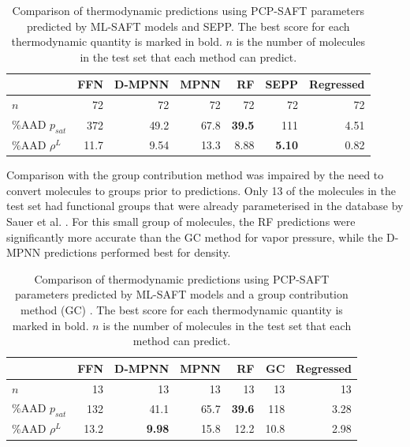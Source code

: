 \begin{table}
	\caption{Comparison of thermodynamic predictions using PCP-SAFT parameters predicted by ML-SAFT models and SEPP.\cite{Kaminski2020} The best score for each thermodynamic quantity is marked in bold. $n$ is the number of molecules in the test set that each method can predict.}
        \label{tab:sepp}
	\begin{center}
        \begin{tabular}{lrrrrr|r}
            & FFN & D-MPNN & MPNN & RF & SEPP & Regressed \\
            \hline
            $n$ & 72 & 72 & 72 & 72 & 72 & 72 \\
            \%AAD $p_{sat}$ & 372 & 49.2 & 67.8 & \textbf{39.5} & 111 & 4.51 \\
            \%AAD $\rho^{L}$ & 11.7 & 9.54 & 13.3 & 8.88 &\textbf{5.10} & 0.82 \\
            \hline
        \end{tabular}
	\end{center}
\end{table}

Comparison with the group contribution method was impaired by the need to convert molecules to groups prior to predictions. Only 13 of the molecules in the test set had functional groups that were already parameterised in the database by Sauer et al. \cite{Sauer2014}. For this small group of molecules, the RF predictions were significantly more accurate than the GC method for vapor pressure, while the D-MPNN predictions performed best for density. 


\begin{table}
	\caption{Comparison of thermodynamic predictions using PCP-SAFT parameters predicted by ML-SAFT models and a group contribution method (GC) \cite{Sauer2014}. The best score for each thermodynamic quantity  is marked in bold. $n$ is the number of molecules in the test set that each method can predict.}
    \label{tab:gc}
	\begin{center}
		\begin{tabular}{lrrrrr|r}
			 & FFN & D-MPNN & MPNN & RF & GC & Regressed \\
			\hline
			$n$ & 13 & 13 & 13 & 13 & 13 & 13 \\
			\%AAD $p_{sat}$ & 132 & 41.1 & 65.7 & \textbf{39.6} & 118 & 3.28 \\
			\%AAD $\rho^{L}$ & 13.2 & \textbf{9.98} & 15.8 & 12.2 & 10.8 & 2.98 \\
                \hline
		\end{tabular}
	\end{center}
\end{table}

